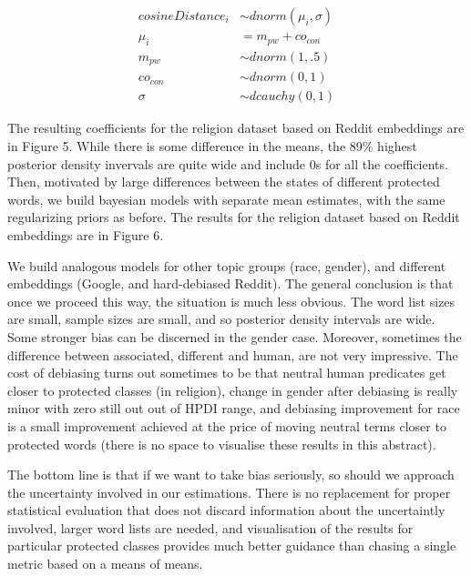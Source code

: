 \documentclass[12pt,dvipsnames,enabledeprecatedfontcommands]{scrartcl}
\begin{document}
\footnotesize

\vspace{-5mm}

\begin{align}
cosineDistance_i  & \sim dnorm(\mu_i, \sigma) \\
\mu_i & = m_{pw} + co_{con}\\
m_{pw} & \sim dnorm(1,.5) \\
co_{con} & \sim dnorm(0,1) \\
\sigma &\sim  dcauchy(0,1)
\end{align} \normalsize 

The resulting coefficients for the religion dataset based on Reddit
embeddings are in Figure 5. While there is some difference in the means,
the 89\% highest posterior density invervals are quite wide and include
0s for all the coefficients. Then, motivated by large differences
between the states of different protected words, we build bayesian
models with separate mean estimates, with the same regularizing priors
as before. The results for the religion dataset based on Reddit
embeddings are in Figure 6.

We build analogous models for other topic groups (race, gender), and
different embeddings (Google, and hard-debiased Reddit). The general
conclusion is that once we proceed this way, the situation is much less
obvious. The word list sizes are small, sample sizes are small, and so
posterior density intervals are wide. Some stronger bias can be
discerned in the gender case. Moreover, sometimes the difference between
associated, different and human, are not very impressive. The cost of
debiasing turns out sometimes to be that neutral human predicates get
closer to protected classes (in religion), change in gender after
debiasing is really minor with zero still out out of HPDI range, and
debiasing improvement for race is a small improvement achieved at the
price of moving neutral terms closer to protected words (there is no
space to visualise these results in this abstract).

The bottom line is that if we want to take bias seriously, so should we
approach the uncertainty involved in our estimations. There is no
replacement for proper statistical evaluation that does not discard
information about the uncertaintly involved, larger word lists are
needed, and visualisation of the results for particular protected
classes provides much better guidance than chasing a single metric based
on a means of means.

\pagebreak
\end{document}
